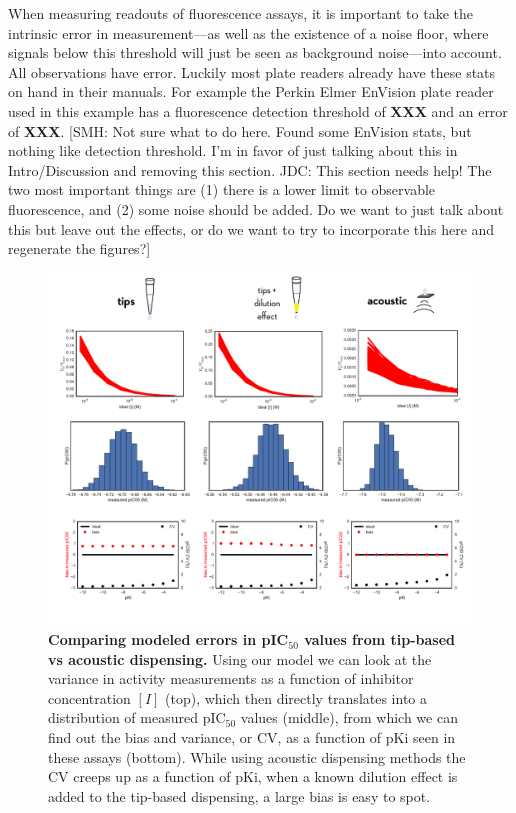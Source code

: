 \documentclass[aps,pre,twocolumn,nofootinbib,superscriptaddress,linenumbers]{revtex4-1}
\begin{document}
When measuring readouts of fluorescence assays, it is important to take the intrinsic error in measurement---as well as the existence of a noise floor, where signals below this threshold will just be seen as background noise---into account.
All observations have error. 
Luckily most plate readers already have these stats on hand in their manuals. 
For example the Perkin Elmer EnVision plate reader used in this example has a fluorescence detection threshold of {\bf XXX} and an error of {\bf XXX}.
{\color{red}[SMH: Not sure what to do here. Found some EnVision stats, but nothing like detection threshold. I'm in favor of just talking about this in Intro/Discussion and removing this section. JDC: This section needs help!  The two most important things are (1) there is a lower limit to observable fluorescence, and (2) some noise should be added.  Do we want to just talk about this but leave out the effects, or do we want to try to incorporate this here and regenerate the figures?]}

\begin{figure}[tb]
\includegraphics[width=1.0\textwidth]{../figures/acoustic-vs-tips.pdf}
  
  \caption{{\bf Comparing modeled errors in pIC$_{50}$ values from tip-based vs acoustic dispensing.}
  Using our model we can look at the variance in activity measurements as a function of inhibitor concentration $[I]$ (top), which then directly translates into a distribution of measured pIC$_{50}$ values (middle), from which we can find out the bias and variance, or CV, as a function of pKi seen in these assays (bottom). While using acoustic dispensing methods the CV creeps up as a function of pKi, when a known dilution effect is added to the tip-based dispensing, a large bias is easy to spot.
  }
  \label{fig:acoustic-vs-tips}
\end{figure}
\end{document}
